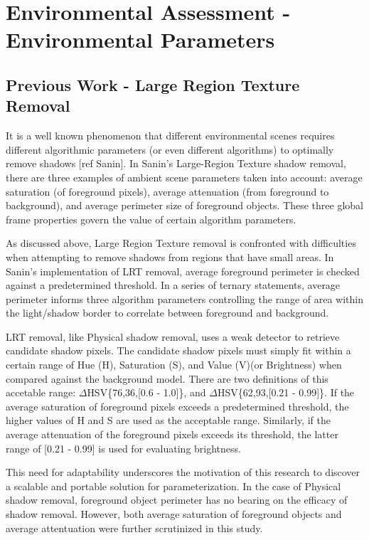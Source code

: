 \documentclass[12pt]{report}
\begin{document}
\section{Environmental Assessment - Environmental Parameters}

\subsection{Previous Work - Large Region Texture Removal}

It is a well known phenomenon that different environmental scenes requires different algorithmic parameters (or even different algorithms) to optimally remove shadows [ref Sanin]. In Sanin's Large-Region Texture shadow removal, there are three examples of ambient scene parameters taken into account: average saturation (of foreground pixels), average attenuation (from foreground to background), and average perimeter size of foreground objects. These three global frame properties govern the value of certain algorithm parameters.

As discussed above, Large Region Texture removal is confronted with difficulties when attempting to remove shadows from regions that have small areas. In Sanin's implementation of LRT removal, average foreground perimeter is checked against a predetermined threshold. In a series of ternary statements, average perimeter informs three algorithm parameters controlling the range of area within the light/shadow border to correlate between foreground and background.

LRT removal, like Physical shadow removal, uses a weak detector to retrieve candidate shadow pixels. The candidate shadow pixels must simply fit within a certain range of Hue (H), Saturation (S), and Value (V)(or Brightness) when compared against the background model. There are two definitions of this accetable range: $\Delta$HSV\{76,36,[0.6 - 1.0]\}, and $\Delta$HSV\{62,93,[0.21 - 0.99]\}. If the average saturation of foreground pixels exceeds a predetermined threshold, the higher values of H and S are used as the acceptable range. Similarly, if the average attenuation of the foreground pixels exceeds its threshold, the latter range of [0.21 - 0.99] is used for evaluating brightness. 

This need for adaptability underscores the motivation of this research to discover a scalable and portable solution for parameterization. In the case of Physical shadow removal, foreground object perimeter has no bearing on the efficacy of shadow removal. However, both average saturation of foreground objects and average attentuation were further scrutinized in this study.
\end{document}
